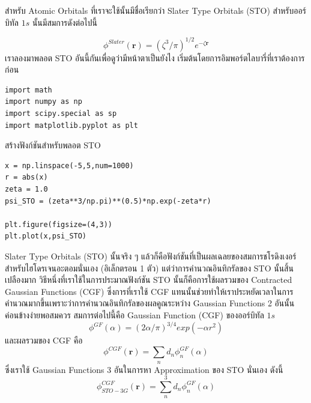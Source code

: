 สำหรับ Atomic Orbitals ที่เราจะใช้นั้นมีชื่อเรียกว่า Slater Type Orbitals (STO) สำหรับออร์บิทัล $1s$ นั้นมีสมการดังต่อไปนี้

\begin{equation}
  \phi^{Slater}\left( \boldsymbol{r}\right)
  =
  \left( \zeta^3/\pi \right)^{1/2}e^{-\zeta \boldsymbol{r}}
\end{equation}
%
เราลองมาพลอต STO อันนี้กันเพื่อดูว่ามีหน้าตาเป็นยังไง เริ่มต้นโดยการอิมพอร์ตไลบารี่ที่เราต้องการก่อน

\vspace{5pt}

\begin{lstlisting}[style=MyPython]
%matplotlib inline
import math
import numpy as np
import scipy.special as sp
import matplotlib.pyplot as plt
\end{lstlisting}
%
\vspace{5pt}
%
สร้างฟังก์ชันสำหรับพลอต STO

\vspace{5pt}

\begin{lstlisting}[style=MyPython]
x = np.linspace(-5,5,num=1000)
r = abs(x)
zeta = 1.0
psi_STO = (zeta**3/np.pi)**(0.5)*np.exp(-zeta*r)

plt.figure(figsize=(4,3))
plt.plot(x,psi_STO)
\end{lstlisting}

\vspace{5pt}

Slater Type Orbitals (STO) นั้นจริง ๆ แล้วก็คือฟังก์ชันที่เป็นผลเฉลยของสมการชโรดิงเงอร์สำหรับไฮโดรเจนอะตอมนั่นเอง (อิเล็กตรอน 1 ตัว) แต่ว่าการคำนวณอินทิกรัลของ STO นั้นสิ้นเปลืองมาก วิธีหนึ่งที่เราใช้ในการประมาณฟังก์ชัน STO นั้นก็คือการใช้ผลรวมของ Contracted Gaussian Functions (CGF) ซึ่งการที่เราใช้ CGF แทนนั้นช่วยทำให้เราประหยัดเวลาในการคำนวณมากขึ้นเพราะว่าการคำนวณอินทิกรัลของผลคูณระหว่าง Gaussian Functions 2 อันนั้นค่อนข้างง่ายพอสมควร สมการต่อไปนี้คือ Gaussian Function (CGF) ของออร์บิทัล $1s$
%
\begin{equation}
  \phi^{GF}(\alpha)
  =
  (2\alpha/\pi)^{3/4}exp(-\alpha r^{2})
\end{equation}
%
และผลรวมของ CGF คือ
%
\begin{equation}
  \phi^{CGF}\left( \boldsymbol{r}\right)
  =
  \sum_n d_n\phi^{GF}_n(\alpha)
\end{equation}
%
ซึ่งเราใช้ Gaussian Functions 3 อันในการหา Approximation ของ STO นั่นเอง ดังนี้
%
\begin{equation}
  \phi^{CGF}_{STO-3G}\left( \boldsymbol{r}\right)
  =
  \sum^3_n d_n\phi^{GF}_n(\alpha)
\end{equation}

